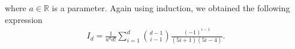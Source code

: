 where $a \in \mathbb{R}$ is a parameter. Again using induction, we obtained the following expression 
\begin{align}
    I_d = \frac{1}{a^{d}d!} \sum_{i = 1}^{d} {d - 1 \choose i - 1}\frac{(-1)^{i - 1}}{(5i + 1)(5i - 4)} .
\end{align}



